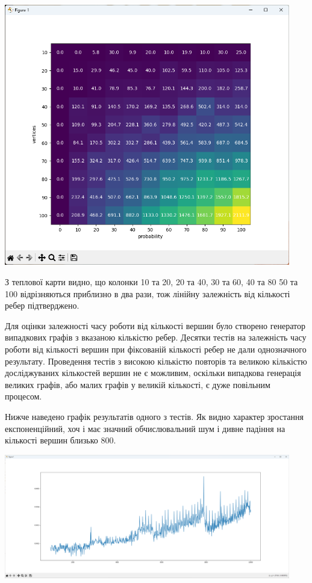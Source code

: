 \documentclass{article}
\begin{document}
\begin{center}
    \includegraphics[width=125mm]{map}
\end{center}

З теплової карти видно, що колонки 10 та 20, 20 та 40, 30 та 60, 40 та 80 50 та 100 відрізняються приблизно в два рази, тож лінійну залежність від кількості ребер підтверджено.\\\indent

Для оцінки залежності часу роботи від кількості вершин було створено генератор випадкових графів з вказаною кількістю ребер. Десятки тестів на залежність часу роботи від кількості вершин при фіксованій кількості ребер не дали однозначного результату. Проведення тестів з високою кількістю повторів та великою кількістю досліджуваних кількостей вершин не є можливим, оскільки випадкова генерація великих графів, або малих графів у великій кількості, є дуже повільним процесом.\\\indent

Нижче наведено графік результатів одного з тестів. Як видно характер зростання експоненційний, хоч і має значний обчислювальний шум і дивне падіння на кількості вершин близько 800.

\begin{center}
    \includegraphics[width=125mm]{graph}
\end{center}
\end{document}
